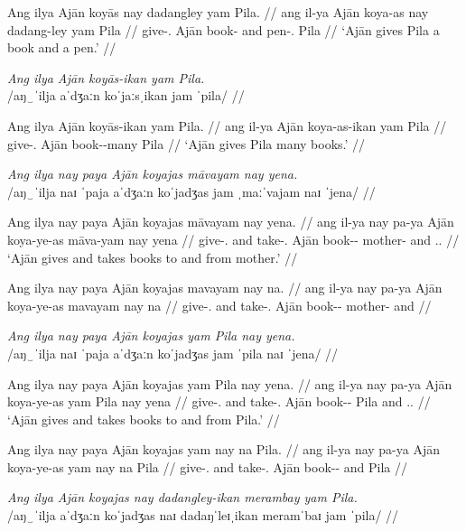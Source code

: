 \documentclass[12pt,a4paper]{scrartcl}
\newcommand{\PargI}{{\Parg}.{\Inan}}
\newcommand{\TsgM}{{\Tsg}.{\M}}
\newcommand{\TsgF}{{\Tsg}.{\F}}
\begin{document}
\gla Ang ilya Ajān koyās nay dadangley yam Pila. //
\glb ang il-ya Ajān koya-as nay dadang-ley yam Pila //
\glc \AgtT{} give-\TsgM{} Ajān book-\Parg{} and pen-\PargI{} \Dat{} Pila //
\glft `Ajān gives Pila a book and a pen.' //
\endgl\xe

\ex\begingl
\glpreamble \textit{Ang ilya Ajān koyās-ikan yam Pila.}\\
	/aŋ‿ˈilja aˈdʒaːn koˈjaːsˌikan jam ˈpila/ //

\gla Ang ilya Ajān koyās-ikan yam Pila. //
\glb ang il-ya Ajān koya-as-ikan yam Pila //
\glc \AgtT{} give-\TsgM{} Ajān book-\Parg{}-many \Dat{} Pila //
\glft `Ajān gives Pila many books.' //
\endgl\xe

\pex
\a\begingl
\glpreamble \textit{Ang ilya nay paya Ajān koyajas māvayam nay yena.} \\
	/aŋ‿ˈilja naɪ ˈpaja aˈdʒaːn koˈjadʒas jam ˌmaːˈvajam naɪ ˈjena/ //

\gla Ang ilya nay paya Ajān koyajas māvayam nay yena. //
\glb ang il-ya nay pa-ya Ajān koya-ye-as māva-yam nay yena //
\glc \AgtT{} give-\TsgM{} and take-\TsgM{} Ajān book-\Pl{}-\Parg{} mother-\Dat{} and \TsgF{}.\Gen{} //
\glft `Ajān gives and takes books to and from mother.' //
\endgl

\a\ljudge*\begingl
\gla Ang ilya nay paya Ajān koyajas mavayam nay na. //
\glb ang il-ya nay pa-ya Ajān koya-ye-as mavayam nay na //
\glc \AgtT{} give-\TsgM{} and take-\TsgM{} Ajān book-\Pl{}-\Parg{} mother-\Dat{} and \Gen{} //
\endgl

\xe

\pex
\a\begingl
\glpreamble \textit{Ang ilya nay paya Ajān koyajas yam Pila nay yena.} \\
	/aŋ‿ˈilja naɪ ˈpaja aˈdʒaːn koˈjadʒas jam ˈpila naɪ ˈjena/ //

\gla Ang ilya nay paya Ajān koyajas yam Pila nay yena. //
\glb ang il-ya nay pa-ya Ajān koya-ye-as yam Pila nay yena //
\glc \AgtT{} give-\TsgM{} and take-\TsgM{} Ajān book-\Pl{}-\Parg{} \Dat{} Pila and \TsgF{}.\Gen{} //
\glft `Ajān gives and takes books to and from Pila.' //
\endgl

\a\ljudge*\begingl
\gla Ang ilya nay paya Ajān koyajas yam nay na Pila. //
\glb ang il-ya nay pa-ya Ajān koya-ye-as yam nay na Pila //
\glc \AgtT{} give-\TsgM{} and take-\TsgM{} Ajān book-\Pl{}-\Parg{} \Dat{} and \Gen{} Pila //
\endgl

\xe

\ex\begingl
\glpreamble \textit{Ang ilya Ajān koyajas nay dadangley-ikan merambay yam Pila.}\\
	/aŋ‿ˈilja aˈdʒaːn koˈjadʒas naɪ dadaŋˈleɪˌikan meramˈbaɪ jam ˈpila/ //
\end{document}
